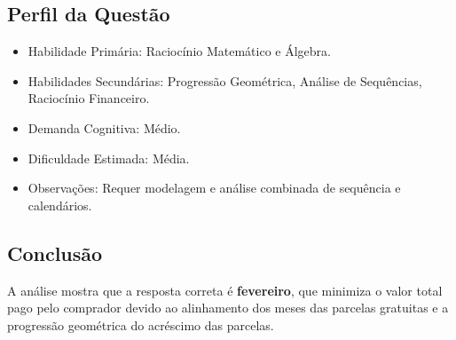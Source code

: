 \documentclass{article}
\begin{document}
\subsection*{Perfil da Questão}
\begin{itemize}
  \item Habilidade Primária: Raciocínio Matemático e Álgebra.
  \item Habilidades Secundárias: Progressão Geométrica, Análise de Sequências, Raciocínio Financeiro.
  \item Demanda Cognitiva: Médio.
  \item Dificuldade Estimada: Média.
  \item Observações: Requer modelagem e análise combinada de sequência e calendários.
\end{itemize}

\subsection*{Conclusão}
A análise mostra que a resposta correta é \textbf{fevereiro}, que minimiza o valor total pago pelo comprador devido ao alinhamento dos meses das parcelas gratuitas e a progressão geométrica do acréscimo das parcelas.
\end{document}
